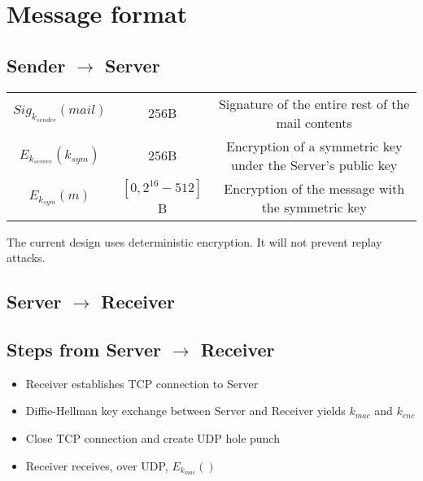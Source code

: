 \documentclass[11pt]{article}
\begin{document}
\section*{Message format}
\subsection*{Sender $\rightarrow$ Server}
\begin{tabular}{c c c}
  $Sig_{k_{sender}}\left(mail\right)$ & $256$B &
    Signature of the entire rest of the mail contents\\
  $E_{k_{server}}\left(k_{sym}\right)$ & $256$B &
    Encryption of a symmetric key under the Server's public key\\
  $E_{k_{sym}}\left(m\right)$ & $\left[0, 2^{16} - 512 \right]$B &
    Encryption of the message with the symmetric key
\end{tabular}
The current design uses deterministic encryption. It will not prevent replay
attacks.

\subsection*{Server $\rightarrow$ Receiver}

\subsection*{Steps from Server $\rightarrow$ Receiver}
\begin{itemize}
  \item Receiver establishes TCP connection to Server
  \item Diffie-Hellman key exchange between Server and Receiver yields
  $k_{mac}$ and $k_{enc}$
  \item Close TCP connection and create UDP hole punch
  \item Receiver receives, over UDP, $E_{k_{mac}}\left(\right)$

\end{itemize}
\end{document}
